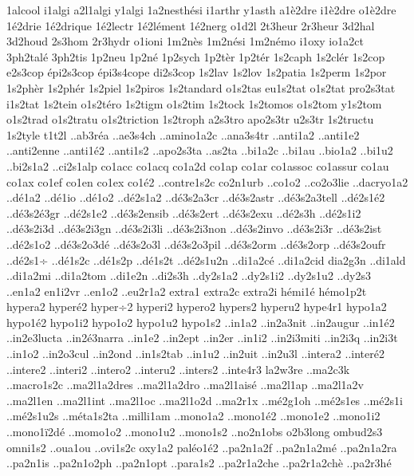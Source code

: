 {1alcool
i1algi
a2l1algi
y1algi
1a2nesth^^e9si
i1arthr
y1asth
a1^^e82dre
i1^^e82dre
o1^^e82dre
1^^e92drie
1^^e92drique
1^^e92lectr
1^^e92l^^e9ment
1^^e92nerg
o1d2l
2t3heur
2r3heur
3d2hal
3d2houd
2s3hom
2r3hydr
o1ioni
1m2n^^e8s
1m2n^^e9si
1m2n^^e9mo
i1oxy
io1a2ct
3ph2tal^^e9
3ph2tis
1p2neu
1p2n^^e9
1p2sych
1p2t^^e8r
1p2t^^e9r
1s2caph
1s2cl^^e9r
1s2cop
e2s3cop
^^e9pi2s3cop
^^e9pi3s4cope
di2s3cop
1s2lav
1s2lov
1s2patia
1s2perm
1s2por
1s2ph^^e8r
1s2ph^^e9r
1s2piel
1s2piros
1s2tandard
o1s2tas
eu1s2tat
o1s2tat
pro2s3tat
i1s2tat
1s2tein
o1s2t^^e9ro
1s2tigm
o1s2tim
1s2tock
1s2tomos
o1s2tom
y1s2tom
o1s2trad
o1s2tratu
o1s2triction
1s2troph
a2s3tro
apo2s3tr
u2s3tr
1s2tructu
1s2tyle
t1t2l
..ab3r^^e9a
..ae3s4ch
..amino1a2c
..ana3s4tr
..anti1a2
..anti1e2
..anti2enne
..anti1^^e92
..anti1s2
..apo2s3ta
..as2ta
..bi1a2c
..bi1au
..bio1a2
..bi1u2
..bi2s1a2
..ci2s1alp
co1acc
co1acq
co1a2d
co1ap
co1ar
co1assoc
co1assur
co1au
co1ax
co1ef
co1en
co1ex
co1^^e92
..contre1s2c
co2n1urb
..co1o2
..co2o3lie
..dacryo1a2
..d^^e91a2
..d^^e91io
..d^^e91o2
..d^^e92s1a2
..d^^e93s2a3cr
..d^^e93s2astr
..d^^e93s2a3tell
..d^^e92s1^^e92
..d^^e93s2^^e93gr
..d^^e92s1e2
..d^^e93s2ensib
..d^^e93s2ert
..d^^e93s2exu
..d^^e92s3h
..d^^e92s1i2
..d^^e93s2i3d
..d^^e93s2i3gn
..d^^e93s2i3li
..d^^e93s2i3non
..d^^e93s2invo
..d^^e93s2i3r
..d^^e93s2ist
..d^^e92s1o2
..d^^e93s2o3d^^e9
..d^^e93s2o3l
..d^^e93s2o3pil
..d^^e93s2orm
..d^^e93s2orp
..d^^e93s2oufr
..d^^e92s1^^f7 %
..d^^e91s2c
..d^^e91s2p
..d^^e91s2t
..d^^e92s1u2n
..di1a2c^^e9
..di1a2cid
dia2g3n
..di1ald
..di1a2mi
..di1a2tom
..di1e2n
..di2s3h
..dy2s1a2
..dy2s1i2
..dy2s1u2
..dy2s3
..en1a2
en1i2vr
..en1o2
..eu2r1a2
extra1
extra2c
extra2i
h^^e9mi1^^e9
h^^e9mo1p2t
hypera2
hyper^^e92
hyper^^f72
hyperi2
hypero2
hypers2
hyperu2
hype4r1
hypo1a2
hypo1^^e92
hypo1i2
hypo1o2
hypo1u2
hypo1s2
..in1a2
..in2a3nit
..in2augur
..in1^^e92
..in2e3lucta
..in2^^e93narra
..in1e2
..in2ept
..in2er
..in1i2
..in2i3miti
..in2i3q
..in2i3t
..in1o2
..in2o3cul
..in2ond
..in1s2tab
..in1u2
..in2uit
..in2u3l
..intera2
..inter^^e92
..intere2
..interi2
..intero2
..interu2
..inters2
..inte4r3
la2w3re
..ma2c3k
..macro1s2c
..ma2l1a2dres
..ma2l1a2dro
..ma2l1ais^^e9
..ma2l1ap
..ma2l1a2v
..ma2l1en
..ma2l1int
..ma2l1oc
..ma2l1o2d
..ma2r1x
..m^^e92g1oh
..m^^e92s1es
..m^^e92s1i
..m^^e92s1u2s
..m^^e9ta1s2ta
..milli1am
..mono1a2
..mono1^^e92
..mono1e2
..mono1i2
..mono1^^ef2d^^e9
..momo1o2
..mono1u2
..mono1s2
..no2n1obs
o2b3long
ombud2s3
omni1s2
..oua1ou
..ovi1s2c
oxy1a2
pal^^e9o1^^e92
..pa2n1a2f
..pa2n1a2m^^e9
..pa2n1a2ra
..pa2n1is
..pa2n1o2ph
..pa2n1opt
..para1s2
..pa2r1a2che
..pa2r1a2ch^^e8
..pa2r3h^^e9
}

